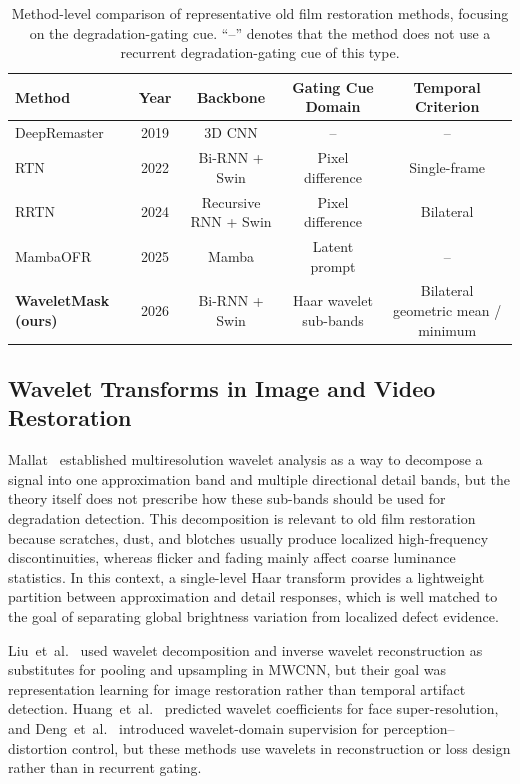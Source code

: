 \documentclass[applsci,article,submit,pdftex,moreauthors]{Definitions/mdpi}
\begin{document}
\begin{table}[H]
\caption{Method-level comparison of representative old film restoration methods, focusing on the degradation-gating cue. ``--'' denotes that the method does not use a recurrent degradation-gating cue of this type.\label{tab:method_comparison}}
\footnotesize
\begin{tabularx}{\textwidth}{lccCC}
\toprule
\textbf{Method} & \textbf{Year} & \textbf{Backbone} & \textbf{Gating Cue Domain} & \textbf{Temporal Criterion} \\
\midrule
DeepRemaster~\cite{iizuka2019deepremaster} & 2019 & 3D CNN & -- & -- \\
RTN~\cite{rtn2022} & 2022 & Bi-RNN + Swin & Pixel difference & Single-frame \\
RRTN~\cite{rrtn2024} & 2024 & Recursive RNN + Swin & Pixel difference & Bilateral \\
MambaOFR~\cite{mao2025mambaofr} & 2025 & Mamba & Latent prompt & -- \\
\textbf{WaveletMask (ours)} & 2026 & Bi-RNN + Swin & Haar wavelet sub-bands & Bilateral geometric mean / minimum \\
\bottomrule
\end{tabularx}
\normalsize
\end{table}

\subsection{Wavelet Transforms in Image and Video Restoration}

Mallat~\cite{mallat1989theory} established multiresolution wavelet analysis as a way to decompose a signal into one approximation band and multiple directional detail bands, but the theory itself does not prescribe how these sub-bands should be used for degradation detection. This decomposition is relevant to old film restoration because scratches, dust, and blotches usually produce localized high-frequency discontinuities, whereas flicker and fading mainly affect coarse luminance statistics. In this context, a single-level Haar transform provides a lightweight partition between approximation and detail responses, which is well matched to the goal of separating global brightness variation from localized defect evidence.

Liu~et~al.~\cite{liu2018mwcnn} used wavelet decomposition and inverse wavelet reconstruction as substitutes for pooling and upsampling in MWCNN, but their goal was representation learning for image restoration rather than temporal artifact detection. Huang~et~al.~\cite{huang2017wavelet} predicted wavelet coefficients for face super-resolution, and Deng~et~al.~\cite{deng2019swd} introduced wavelet-domain supervision for perception--distortion control, but these methods use wavelets in reconstruction or loss design rather than in recurrent gating.
\end{document}
